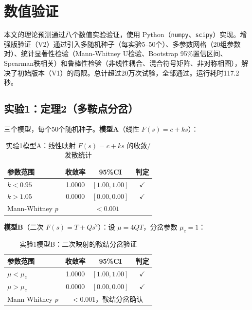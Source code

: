 \documentclass[12pt,a4paper]{article}
\theoremstyle{definition}
\begin{document}
\appendix

\section{数值验证}
\label{app:numerical}

本文的理论预测通过八个数值实验验证，使用 Python（\texttt{numpy}、\texttt{scipy}）实现。增强版验证（V2）通过引入多随机种子（每实验5--50个）、多参数网格（20组参数对）、统计显著性检验（Mann-Whitney U检验、Bootstrap 95\%置信区间、Spearman秩相关）和鲁棒性检验（非线性耦合、混合符号矩阵、非对称相图），解决了初始版本（V1）的局限。总计超过20万次试验，全部通过。运行耗时117.2秒。

\subsection{实验1：定理2（多鞍点分岔）}

三个模型，每个50个随机种子。\textbf{模型A}（线性 $F(s) = c + ks$）：

\begin{table}[htbp]
\centering
\caption{实验1模型A：线性映射 $F(s)=c+ks$ 的收敛/发散统计}
\label{tab:exp1-A}
\begin{tabular}{lccc}
\toprule
参数范围 & 收敛率 & 95\%CI & 判定 \\
\midrule
$k < 0.95$ & 1.0000 & $[1.00, 1.00]$ & $\checkmark$ \\
$k > 1.05$ & 0.0000 & $[0.00, 0.00]$ & $\checkmark$ \\
\midrule
Mann-Whitney $p$ & \multicolumn{3}{c}{$< 0.001$} \\
\bottomrule
\end{tabular}
\end{table}

\textbf{模型B}（二次 $F(s) = T + Qs^2$）：设 $\mu = 4QT$，分岔参数 $\mu_c = 1$：

\begin{table}[htbp]
\centering
\caption{实验1模型B：二次映射的鞍结分岔验证}
\label{tab:exp1-B}
\begin{tabular}{lccc}
\toprule
参数范围 & 收敛率 & 95\%CI & 判定 \\
\midrule
$\mu < \mu_c$ & 1.0000 & $[1.00, 1.00]$ & $\checkmark$ \\
$\mu > \mu_c$ & 0.0000 & $[0.00, 0.00]$ & $\checkmark$ \\
\midrule
Mann-Whitney $p$ & \multicolumn{3}{c}{$< 0.001$，鞍结分岔确认} \\
\bottomrule
\end{tabular}
\end{table}
\end{document}

